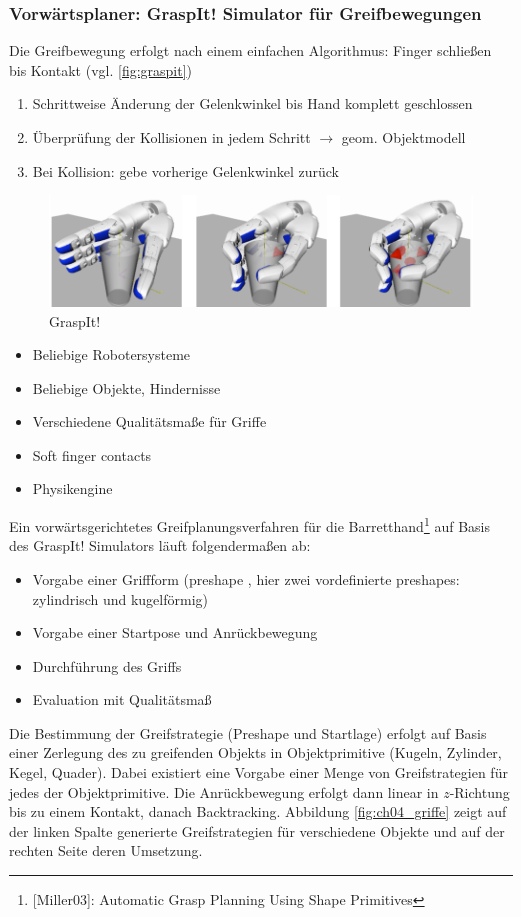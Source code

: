 \subsubsection*{Vorwärtsplaner: GraspIt! Simulator für Greifbewegungen}
Die Greifbewegung erfolgt nach einem einfachen Algorithmus: Finger schließen bis Kontakt (vgl. \autoref{fig:graspit})
\begin{enumerate}
\item Schrittweise Änderung der Gelenkwinkel bis Hand komplett geschlossen
\item Überprüfung der Kollisionen in jedem Schritt $\rightarrow$ geom. Objektmodell
\item Bei Kollision: gebe vorherige Gelenkwinkel zurück
\end{enumerate}
\begin{figure}[h!]
	\centering
	\includegraphics[width=.7\textwidth]{figures/ch04_graspit.png}
	\caption{GraspIt!}
	\label{fig:graspit}
\end{figure}
\begin{itemize}
\item Beliebige Robotersysteme
\item Beliebige Objekte, Hindernisse
\item Verschiedene Qualitätsmaße für Griffe
\item Soft finger contacts
\item Physikengine
\end{itemize}
Ein vorwärtsgerichtetes Greifplanungsverfahren für die Barretthand\footnote{[Miller03]: Automatic Grasp Planning Using Shape Primitives} auf Basis des GraspIt! Simulators läuft folgendermaßen ab:
\begin{itemize}
\item Vorgabe einer Griffform (\Gu preshape \Go, hier zwei vordefinierte preshapes: zylindrisch und kugelförmig)
\item Vorgabe einer Startpose und Anrückbewegung
\item Durchführung des Griffs
\item Evaluation mit Qualitätsmaß
\end{itemize}
Die Bestimmung der Greifstrategie (Preshape und Startlage) erfolgt auf Basis einer Zerlegung des zu greifenden Objekts in Objektprimitive (Kugeln, Zylinder, Kegel, Quader). Dabei existiert eine Vorgabe einer Menge von Greifstrategien für jedes der Objektprimitive. Die Anrückbewegung erfolgt dann linear in $z$-Richtung bis zu einem Kontakt, danach Backtracking. Abbildung \ref{fig:ch04_griffe} zeigt auf der linken Spalte generierte Greifstrategien für verschiedene Objekte und auf der rechten Seite deren Umsetzung.
